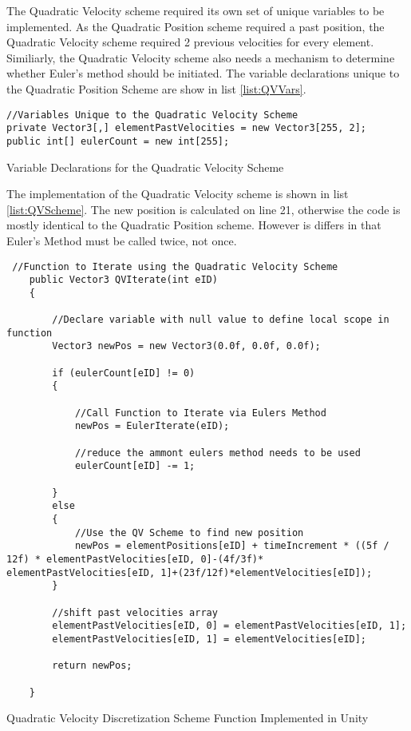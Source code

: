 The Quadratic Velocity scheme required its own set of unique variables to be implemented. As the Quadratic Position scheme required a past position, the Quadratic Velocity scheme required 2 previous velocities for every element. Similiarly, the Quadratic Velocity scheme also needs a mechanism to determine whether Euler's method should be initiated. The variable declarations unique to the Quadratic Position Scheme are show in list \ref{list:QVVars}.

\begin{listing}[H]
\begin{verbatim}
//Variables Unique to the Quadratic Velocity Scheme 
private Vector3[,] elementPastVelocities = new Vector3[255, 2];
public int[] eulerCount = new int[255];
\end{verbatim}
\caption{Variable Declarations for the Quadratic Velocity Scheme}
\label{list:QVVars}
\end{listing}

The implementation of the Quadratic Velocity scheme is shown in list \ref{list:QVScheme}. The new position is calculated on line 21, otherwise the code is mostly identical to the Quadratic Position scheme. However is differs in that Euler's Method must be called twice, not once.

\begin{listing}[H]
\begin{verbatim}
 //Function to Iterate using the Quadratic Velocity Scheme
    public Vector3 QVIterate(int eID)
    {

        //Declare variable with null value to define local scope in function
        Vector3 newPos = new Vector3(0.0f, 0.0f, 0.0f);

        if (eulerCount[eID] != 0)
        {

            //Call Function to Iterate via Eulers Method
            newPos = EulerIterate(eID);

            //reduce the ammont eulers method needs to be used
            eulerCount[eID] -= 1;

        }
        else
        {
            //Use the QV Scheme to find new position
            newPos = elementPositions[eID] + timeIncrement * ((5f / 12f) * elementPastVelocities[eID, 0]-(4f/3f)* elementPastVelocities[eID, 1]+(23f/12f)*elementVelocities[eID]);
        }

        //shift past velocities array
        elementPastVelocities[eID, 0] = elementPastVelocities[eID, 1];
        elementPastVelocities[eID, 1] = elementVelocities[eID];

        return newPos;
  
    }
\end{verbatim}
\caption{Quadratic Velocity Discretization Scheme Function Implemented in Unity}
\label{list:QVScheme}
\end{listing}

